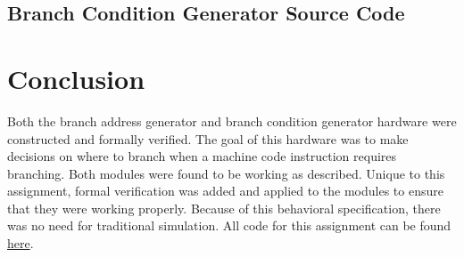 \documentclass[
    a4paper, %
	12pt, %
    ]{CSSullivanBusinessReport}
\begin{document}
\begin{fullwidth}
\newpage




\subsection{Branch Condition Generator Source Code} %




\newpage





\section{Conclusion} %
\hypersetup{urlcolor=blue} 
Both the branch address generator and branch condition generator hardware were constructed and formally verified. The goal of this hardware was to make decisions on where to branch when a machine code instruction requires branching. Both modules were found to be working as described. Unique to this assignment, formal verification was added and applied to the modules to ensure that they were working properly. Because of this behavioral specification, there was no need for traditional simulation.
All code for this assignment can be found \href{https://github.com/EthanV1920/CPE-233-Otter/tree/main}{here}.


\end{fullwidth}
\end{document}
